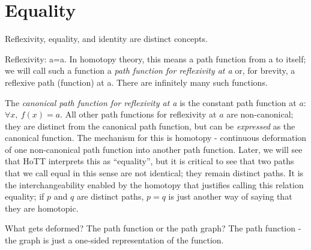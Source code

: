 \documentclass{article}
\begin{document}
\section{Equality}

Reflexivity, equality, and identity are distinct concepts.

Reflexivity: a=a.  In homotopy theory, this means a path function from
a to itself; we will call such a function a \emph{path function for
reflexivity at a} or, for brevity, a reflexive path (function) at a.
There are infinitely many such functions.


The \emph{canonical path function for reflexivity at a} is the
constant path function at \(a\): \(\forall x,\ f(x) = a\).  All other
path functions for reflexivity at \(a\) are non-canonical; they are
distinct from the canonical path function, but can be \emph{expressed}
as the canonical function.  The mechanism for this is homotopy -
continuous deformation of one non-canonical path function into another
path function.  Later, we will see that HoTT interprets this as
``equality'', but it is critical to see that two paths that we call
equal in this sense are not identical; they remain distinct paths.  It
is the interchangeability enabled by the homotopy that justifies
calling this relation equality; if \(p\) and \(q\) are distinct paths,
\(p=q\) is just another way of saying that they are homotopic.

What gets deformed?  The path function or the path graph?  The path
function - the graph is just a one-sided representation of the
function.
\end{document}

